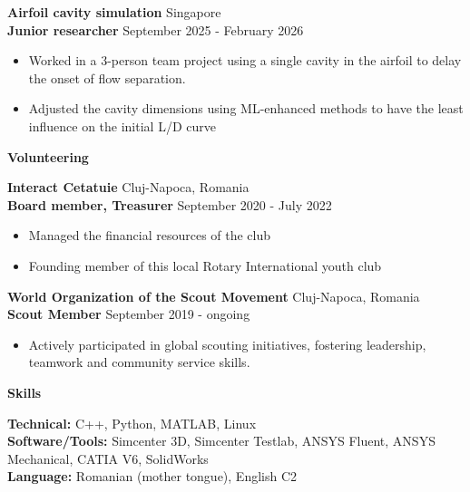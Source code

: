 \documentclass[11pt]{article}
\newcommand{\cvsection}[1]{%
  \vspace{16pt}%
  \centerline{\textbf{#1}}%
  \vspace{8pt}%
}
\newcommand{\cvrole}[4]{%
  \textbf{#1} \hfill #2 \\
  \textbf{#3} \hfill #4\par
}
\newcommand{\cvgap}{\vspace{0.7em}}
\begin{document}
\cvrole{Airfoil cavity simulation}{Singapore}{Junior researcher}{September 2025 - February 2026}
\begin{itemize}
  \item Worked in a 3-person team project using a single cavity in the airfoil to delay the onset of flow separation.
  \item Adjusted the cavity dimensions using ML-enhanced methods to have the least influence on the initial L/D curve
\end{itemize}

\cvsection{Volunteering}

\cvrole{Interact Cetatuie}{Cluj-Napoca, Romania}{Board member, Treasurer}{September 2020 - July 2022}
\begin{itemize}
  \item Managed the financial resources of the club
  \item Founding member of this local Rotary International youth club
\end{itemize}
\cvgap

\cvrole{World Organization of the Scout Movement}{Cluj-Napoca, Romania}{Scout Member}{September 2019 - ongoing}
\begin{itemize}
  \item Actively participated in global scouting initiatives, fostering leadership, teamwork and community service skills.
\end{itemize}

\vspace{-8pt}
\cvsection{Skills}

\textbf{Technical:} C++, Python, MATLAB, Linux \\
\textbf{Software/Tools:} Simcenter 3D, Simcenter Testlab, ANSYS Fluent, ANSYS Mechanical, CATIA V6, SolidWorks \\
\textbf{Language:} Romanian (mother tongue), English C2
\end{document}

